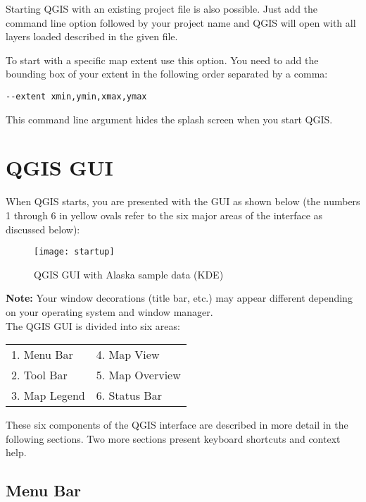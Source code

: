 Starting QGIS with an existing project file is also possible. Just
add the command line option  followed by your project
name and QGIS will open with all layers loaded described in the given file.

To start with a specific map extent use this option. You need to add the bounding box of your extent in the following order separated by a comma:
\begin{verbatim}
--extent xmin,ymin,xmax,ymax
\end{verbatim}

This command line argument hides the splash screen when you start QGIS.

\section{QGIS GUI}
\label{label_qgismainwindow}

When QGIS starts, you are presented with the GUI as shown below
(the numbers 1 through 6 in yellow ovals refer to the six major areas of the
interface as discussed below):

\begin{figure}[ht]
   \centering
    \texttt{[image: startup]}
    \caption{QGIS GUI with Alaska sample data \nixcaption (KDE)} \label{fig:startup} 
\end{figure}

\textbf{Note:} Your window decorations (title bar, etc.) may appear
different depending on your operating system and window manager.\\

The QGIS GUI is divided into six areas:

\begin{tabular}{p{5cm} p{5cm}}
1. Menu Bar & 4. Map View \\
2. Tool Bar & 5. Map Overview \\
3. Map Legend & 6. Status Bar \\ 
\end{tabular}

These six components of the QGIS interface are described in more detail in
the following sections. Two more sections present keyboard shortcuts and 
context help.


\subsection{Menu Bar}\label{label_menubar}


